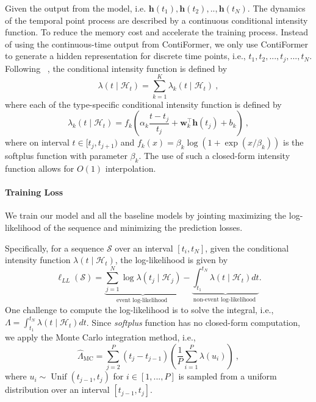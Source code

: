 Given the output from the model, i.e. $\mathbf{h}\left(t_1\right), \mathbf{h}\left(t_2\right),  .., \mathbf{h}\left(t_N\right)$. The dynamics of the temporal point process are described by a continuous conditional intensity function. To reduce the memory cost and accelerate the training process. Instead of using the continuous-time output from ContiFormer, we only use ContiFormer to generate a hidden representation for discrete time points, i.e., $t_1, t_2, ..., t_j, ..., t_N$. Following ~\cite{zuo2020transformer}, the conditional intensity function is defined by
\begin{equation}
\lambda\left(t \mid \mathcal{H}_t\right)=\sum_{k=1}^K \lambda_k\left(t \mid \mathcal{H}_t\right) ~,
\end{equation}
where each of the type-specific conditional intensity function is defined by
\begin{equation}
\lambda_k\left(t \mid \mathcal{H}_t\right)=f_k\left(\alpha_k \frac{t-t_j}{t_j}+\mathbf{w}_k^{\top} \mathbf{h}\left(t_j\right)+b_k\right) ~,
\end{equation}
where on interval $t \in [t_j, t_{j+1})$ and $f_k(x)=\beta_k \log \left(1+\exp \left(x / \beta_k\right)\right)$ is the softplus function with parameter $\beta_k$. The use of such a closed-form intensity function allows for $O(1)$ interpolation.

\paragraph{Training Loss} \label{sec:loss}

We train our model and all the baseline models by jointing maximizing the log-likelihood of the sequence and minimizing the prediction losses.

Specifically, for a sequence $\mathcal{S}$ over an interval $[t_i, t_N]$, given the conditional intensity function $\lambda\left(t \mid \mathcal{H}_t\right)$, the log-likelihood is given by
\begin{equation}
\ell_{LL}(\mathcal{S})=\underbrace{\sum_{j=1}^N \log \lambda\left(t_j \mid \mathcal{H}_j\right)}_{\text {event log-likelihood }}-\underbrace{\int_{t_1}^{t_N} \lambda\left(t \mid \mathcal{H}_t\right) d t}_{\text {non-event log-likelihood }} .
\end{equation}
One challenge to compute the log-likelihood is to solve the integral, i.e., $\Lambda=\int_{t_1}^{t_N} \lambda\left(t \mid \mathcal{H}_t\right) d t$. Since \textit{softplus} function has no closed-form computation, we apply the Monte Carlo integration method, i.e.,
\begin{equation}
\widehat{\Lambda}_{\mathrm{MC}}=\sum_{j=2}^P\left(t_j-t_{j-1}\right)\left(\frac{1}{P} \sum_{i=1}^P \lambda\left(u_i\right)\right) ~,
\end{equation}
where $u_i \sim \operatorname{Unif}(t_{j-1}, t_j)$ for $i \in [1, ..., P]$ is sampled from a uniform distribution over an interval $[t_{j-1}, t_j]$.

